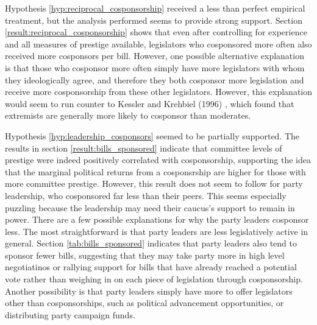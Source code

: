 \documentclass{article}
\begin{document}
  Hypothesis \ref{hyp:reciprocal_cosponsorship} received a less than perfect empirical treatment, but the analysis performed seems to provide strong support. Section \ref{result:reciprocal_cosponsorship} shows that even after controlling for experience and all measures of prestige available, legislators who cosponsored more often also received more cosponsors per bill. However, one possible alternative explanation is that those who cosponsor more often simply have more legislators with whom they ideologically agree, and therefore they both cosponsor more legislation and receive more cosponsorship from these other legislators. However, this explanation would seem to run counter to Kessler and Krehbiel (1996) \cite{kessler_krehbiel1996}, which found that extremists are generally more likely to cosponsor than moderates. 

  Hypothesis \ref{hyp:leadership_cosponsors} seemed to be partially supported. The results in section \ref{result:bills_sponsored} indicate that committee levels of prestige were indeed positively correlated with cosponsorship, supporting the idea that the marginal political returns from a cosponsrship are higher for those with more committee prestige. However, this result does not seem to follow for party leadership, who cosponsored far less than their peers. This seems especially puzzling because the leadership may need their caucus's support to remain in power. There are a few possible explanations for why the party leaders cosponsor less. The most straightforward is that party leaders are less legislatively active in general. Section \ref{tab:bills_sponsored} indicates that party leaders also tend to sponsor fewer bills, suggesting that they may take party more in high level negotiatinos or rallying support for bills that have already reached a potential vote rather than weighing in on each piece of legislation through cosponsorship. Another possibility is that party leaders simply have more to offer legislators other than cosponsorships, such as political advancement opportunities, or distributing party campaign funds. 
\end{document}

